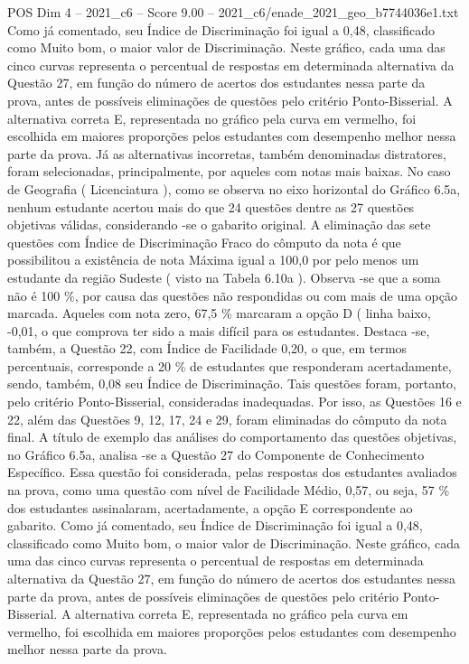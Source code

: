 \begin{textsample}{POS Dim 4 – 2021\_c6 – Score 9.00 – 2021\_c6/enade\_2021\_geo\_b7744036e1.txt}
Como já comentado, seu Índice de Discriminação foi igual a 0,48, classificado como Muito bom, o maior valor de Discriminação.
Neste gráfico, cada uma das cinco curvas representa o percentual de respostas em determinada alternativa da Questão 27, em função do número de acertos dos estudantes nessa parte da prova, antes de possíveis eliminações de questões pelo critério Ponto-Bisserial.
A alternativa correta E, representada no gráfico pela curva em vermelho, foi escolhida em maiores proporções pelos estudantes com desempenho melhor nessa parte da prova.
Já as alternativas incorretas, também denominadas distratores, foram selecionadas, principalmente, por aqueles com notas mais baixas.
No caso de Geografia ( Licenciatura ), como se observa no eixo horizontal do Gráfico 6.5a, nenhum estudante acertou mais do que 24 questões dentre as 27 questões objetivas válidas, considerando -se o gabarito original.
A eliminação das sete questões com Índice de Discriminação Fraco do cômputo da nota é que possibilitou a existência de nota Máxima igual a 100,0 por pelo menos um estudante da região Sudeste ( visto na Tabela 6.10a ).
Observa -se que a soma não é 100 \%, por causa das questões não respondidas ou com mais de uma opção marcada.
Aqueles com nota zero, 67,5 \% marcaram a opção D ( linha baixo, -0,01, o que comprova ter sido a mais difícil para os estudantes.
Destaca -se, também, a Questão 22, com Índice de Facilidade 0,20, o que, em termos percentuais, corresponde a 20 \% de estudantes que responderam acertadamente, sendo, também, 0,08 seu Índice de Discriminação.
Tais questões foram, portanto, pelo critério Ponto-Bisserial, consideradas inadequadas.
Por isso, as Questões 16 e 22, além das Questões 9, 12, 17, 24 e 29, foram eliminadas do cômputo da nota final.
A título de exemplo das análises do comportamento das questões objetivas, no Gráfico 6.5a, analisa -se a Questão 27 do Componente de Conhecimento Específico.
Essa questão foi considerada, pelas respostas dos estudantes avaliados na prova, como uma questão com nível de Facilidade Médio, 0,57, ou seja, 57 \% dos estudantes assinalaram, acertadamente, a opção E correspondente ao gabarito.
Como já comentado, seu Índice de Discriminação foi igual a 0,48, classificado como Muito bom, o maior valor de Discriminação.
Neste gráfico, cada uma das cinco curvas representa o percentual de respostas em determinada alternativa da Questão 27, em função do número de acertos dos estudantes nessa parte da prova, antes de possíveis eliminações de questões pelo critério Ponto-Bisserial.
A alternativa correta E, representada no gráfico pela curva em vermelho, foi escolhida em maiores proporções pelos estudantes com desempenho melhor nessa parte da prova.

\end{textsample}
